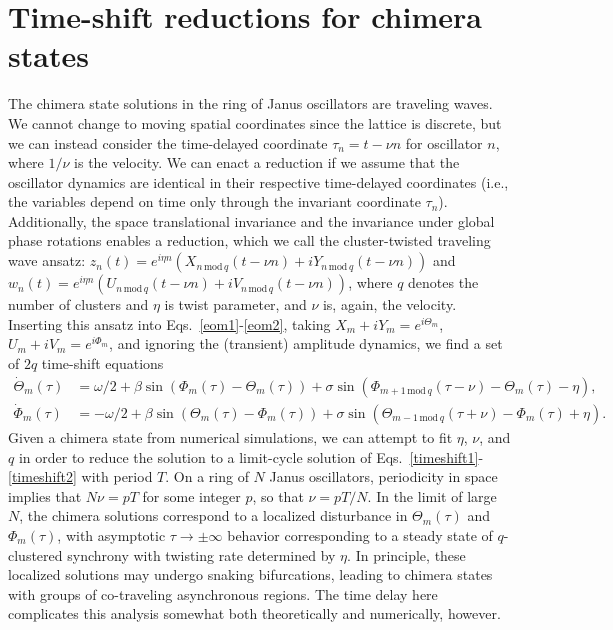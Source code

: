 \documentclass[aps,pre,amsmath,amssymb,floatfix,onecolumn,notitlepage,10pt]{revtex4-1}
\begin{document}
\section{Time-shift reductions for chimera states}
The chimera state solutions in the ring of Janus oscillators are traveling waves. We cannot change to moving spatial coordinates since the lattice is discrete, but we can instead consider the time-delayed coordinate $\tau_n = t - \nu n$ for oscillator $n$, where $1/\nu$ is the velocity. We can enact a reduction if we assume that the oscillator dynamics are identical in their respective time-delayed coordinates (i.e., the variables depend on time only through the invariant coordinate $\tau_n$). Additionally, the space translational invariance and the invariance under global phase rotations enables a reduction, which we call the cluster-twisted traveling wave ansatz: $z_n(t) = e^{i\eta n}\left(X_{n\,\text{mod}\,q}(t-\nu n)+iY_{n\,\text{mod}\,q}(t-\nu n)\right)$ and $w_n(t) = e^{i\eta n}\left(U_{n\,\text{mod}\,q}(t-\nu n)+iV_{n\,\text{mod}\,q}(t-\nu n)\right)$, where $q$ denotes the number of clusters and $\eta$ is twist parameter, and $\nu$ is, again, the velocity.  Inserting this ansatz into Eqs.~\eqref{eom1}-\eqref{eom2}, taking $X_m + iY_m = e^{i\Theta_m}$, $U_m+iV_m=e^{i\Phi_m}$, and ignoring the (transient) amplitude dynamics, we find a set of $2q$ time-shift equations
\begin{align}
\dot{\Theta}_m(\tau) &= \omega/2 + \beta\sin(\Phi_m(\tau)-\Theta_m(\tau)) + \sigma\sin(\Phi_{m+1\, \text{mod}\, q}(\tau-\nu) -\Theta_m(\tau)-\eta), \label{timeshift1} \\
\dot{\Phi}_m(\tau) &= -\omega/2 + \beta\sin(\Theta_m(\tau)-\Phi_m(\tau)) + \sigma\sin(\Theta_{m-1\, \text{mod}\, q}(\tau+\nu) -\Phi_m(\tau)+\eta). \label{timeshift2}
\end{align}
Given a chimera state from numerical simulations, we can attempt to fit $\eta$, $\nu$, and $q$ in order to reduce the solution to a limit-cycle solution of Eqs.~\eqref{timeshift1}-\eqref{timeshift2} with period $T$. On a ring of $N$ Janus oscillators, periodicity in space implies that $N\nu = p T$ for some integer $p$, so that $\nu = pT/N$. In the limit of large $N$, the chimera solutions correspond to a localized disturbance in $\Theta_m(\tau)$ and $\Phi_m(\tau)$, with asymptotic $\tau \to \pm \infty$ behavior corresponding to a steady state of $q$-clustered synchrony with twisting rate determined by $\eta$. In principle, these localized solutions may undergo snaking bifurcations, leading to chimera states with groups of co-traveling asynchronous regions. The time delay here complicates this analysis somewhat both theoretically and numerically, however.
\end{document}

